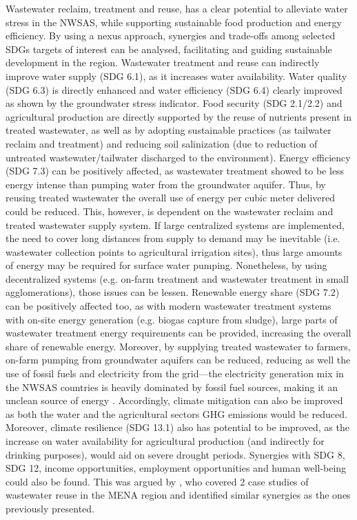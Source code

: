 Wastewater reclaim, treatment and reuse, has a clear potential to alleviate water stress in the NWSAS, while supporting sustainable food production and energy efficiency. By using a nexus approach, synergies and trade-offs among selected SDGs targets of interest can be analysed, facilitating and guiding sustainable development in the region. Wastewater treatment and reuse can indirectly improve water supply (SDG 6.1), as it increases water availability. Water quality (SDG 6.3) is directly enhanced and water efficiency (SDG 6.4) clearly improved as shown by the groundwater stress indicator. Food security (SDG 2.1/2.2) and agricultural production are directly supported by the reuse of nutrients present in treated wastewater, as well as by adopting sustainable practices (as tailwater reclaim and treatment) and reducing soil salinization (due to reduction of untreated wastewater/tailwater discharged to the environment). Energy efficiency (SDG 7.3) can be positively affected, as wastewater treatment showed to be less energy intense than pumping water from the groundwater aquifer. Thus, by reusing treated wastewater the overall use of energy per cubic meter delivered could be reduced. This, however, is dependent on the wastewater reclaim and treated wastewater supply system. If large centralized systems are implemented, the need to cover long distances from supply to demand may be inevitable (i.e. wastewater collection points to agricultural irrigation sites), thus large amounts of energy may be required for surface water pumping. Nonetheless, by using decentralized systems (e.g. on-farm treatment and wastewater treatment in small agglomerations), those issues can be lessen. Renewable energy share (SDG 7.2) can be positively affected too, as with modern wastewater treatment systems with on-site energy generation (e.g. biogas capture from sludge), large parts of wastewater treatment energy requirements can be provided, increasing the overall share of renewable energy. Moreover, by supplying treated wastewater to farmers, on-farm pumping from groundwater aquifers can be reduced, reducing as well the use of fossil fuels and electricity from the grid---the electricity generation mix in the NWSAS countries is heavily dominated by fossil fuel sources, making it an unclean source of energy \cite{AlgeriaElectricityHeat2016,LibyaElectricityHeat2016,TunisiaElectricityHeat2016}. Accordingly, climate mitigation can also be improved as both the water and the agricultural sectors GHG emissions would be reduced. Moreover, climate resilience (SDG 13.1) also has potential to be improved, as the increase on water availability for agricultural production (and indirectly for drinking purposes), would aid on severe drought periods. Synergies with SDG 8, SDG 12, income opportunities, employment opportunities and human well-being could also be found. This was argued by \citet{hoffNexusApproachMENA2019}, who covered 2 case studies of wastewater reuse in the MENA region and identified similar synergies as the ones previously presented.

